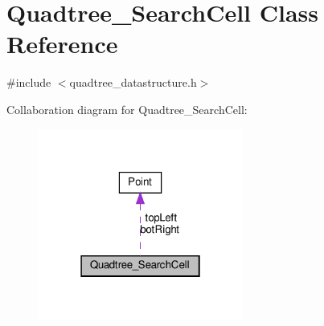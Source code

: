 \hypertarget{classQuadtree__SearchCell}{}\section{Quadtree\+\_\+\+Search\+Cell Class Reference}
\label{classQuadtree__SearchCell}


{\ttfamily \#include $<$quadtree\+\_\+datastructure.\+h$>$}



Collaboration diagram for Quadtree\+\_\+\+Search\+Cell\+:\nopagebreak
\begin{figure}[H]
\begin{center}
\leavevmode
\includegraphics[width=190pt]{classQuadtree__SearchCell__coll__graph}
\end{center}
\end{figure}
